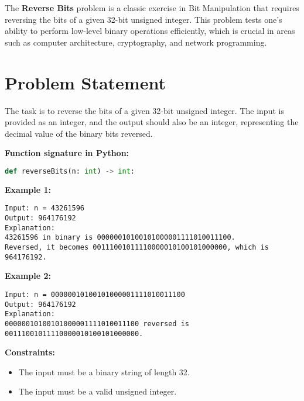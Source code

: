
\label{chap:Reverse_Bits}

The \textbf{Reverse Bits} problem is a classic exercise in Bit Manipulation that requires reversing the bits of a given 32-bit unsigned integer. This problem tests one's ability to perform low-level binary operations efficiently, which is crucial in areas such as computer architecture, cryptography, and network programming.

\section*{Problem Statement}

The task is to reverse the bits of a given 32-bit unsigned integer. The input is provided as an integer, and the output should also be an integer, representing the decimal value of the binary bits reversed.

\textbf{Function signature in Python:}
\begin{lstlisting}[language=Python]
def reverseBits(n: int) -> int:
\end{lstlisting}

\textbf{Example 1:}
\begin{verbatim}
Input: n = 43261596
Output: 964176192
Explanation: 
43261596 in binary is 00000010100101000001111010011100.
Reversed, it becomes 00111001011110000010100101000000, which is 964176192.
\end{verbatim}

\textbf{Example 2:}
\begin{verbatim}
Input: n = 00000010100101000001111010011100
Output: 964176192
Explanation: 
00000010100101000001111010011100 reversed is 00111001011110000010100101000000.
\end{verbatim}

\textbf{Constraints:}
\begin{itemize}
    \item The input must be a binary string of length 32.
    \item The input must be a valid unsigned integer.
\end{itemize}

